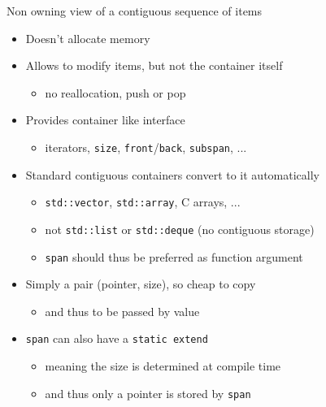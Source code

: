 \begin{frame}[fragile]
  \begin{block}{Non owning view of a contiguous sequence of items}
    \begin{itemize}
    \item Doesn't allocate memory
    \item Allows to modify items, but not the container itself
      \begin{itemize}
      \item no reallocation, push or pop
      \end{itemize}
    \item Provides container like interface
      \begin{itemize}
      \item iterators, \texttt{size}, \texttt{front}/\texttt{back}, \texttt{subspan}, ...
      \end{itemize}
    \item Standard contiguous containers convert to it automatically
      \begin{itemize}
      \item \texttt{std::vector}, \texttt{std::array}, C arrays, ...
      \item not \texttt{std::list} or \texttt{std::deque} (no contiguous storage)
      \item \texttt{span} should thus be preferred as function argument
      \end{itemize}
    \item Simply a pair (pointer, size), so cheap to copy
      \begin{itemize}
      \item and thus to be passed by value
      \end{itemize}
    \item \texttt{span} can also have a \texttt{static extend}
      \begin{itemize}
      \item meaning the size is determined at compile time
      \item and thus only a pointer is stored by \texttt{span}
      \end{itemize}
    \end{itemize}
  \end{block}
\end{frame}

